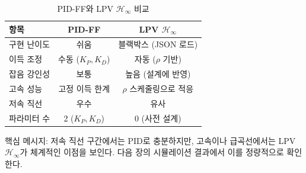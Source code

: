 \begin{table}[h]
    \centering
    \caption{PID-FF와 LPV $\mathcal{H}_\infty$ 비교}
    \begin{tabular}{lcc}
        \toprule
        항목 & PID-FF & LPV $\mathcal{H}_\infty$ \\
        \midrule
        구현 난이도 & 쉬움 & 블랙박스 (JSON 로드) \\
        이득 조정 & 수동 ($K_P, K_D$) & 자동 ($\rho$ 기반) \\
        잡음 강인성 & 보통 & 높음 (설계에 반영) \\
        고속 성능 & 고정 이득 한계 & $\rho$ 스케줄링으로 적응 \\
        저속 직선 & 우수 & 유사 \\
        파라미터 수 & 2 ($K_P, K_D$) & 0 (사전 설계) \\
        \bottomrule
    \end{tabular}
    \label{tab:comparison}
\end{table}

핵심 메시지: 저속 직선 구간에서는 PID로 충분하지만,
고속이나 급곡선에서는 LPV $\mathcal{H}_\infty$가 체계적인 이점을 보인다.
다음 장의 시뮬레이션 결과에서 이를 정량적으로 확인한다.
